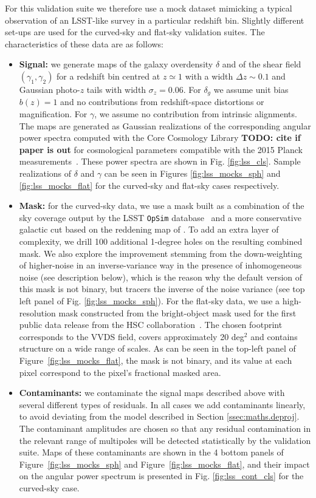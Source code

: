 \documentclass[usenatbib]{mnrasb}
\newcommand{\todo}[1]{{\bf TODO: #1}}
\newcommand{\todo}[1]{}
\begin{document}
        For this validation suite we therefore use a mock dataset mimicking a typical observation of an LSST-like survey in a particular redshift bin. Slightly different set-ups are used for the curved-sky and flat-sky validation suites. The characteristics of these data are as follows:
        \begin{itemize}
          \item {\bf Signal:} we generate maps of the galaxy overdensity $\delta$ and of the shear field $(\gamma_1,\gamma_2)$ for a redshift bin centred at $z\simeq1$ with a width $\Delta z\sim0.1$ and Gaussian photo-$z$ tails with width $\sigma_z=0.06$. For $\delta_g$ we assume unit bias $b(z)=1$ and no contributions from redshift-space distortions or magnification. For $\gamma$, we assume no contribution from intrinsic alignments. The maps are generated as Gaussian realizations of the corresponding angular power spectra computed with the Core Cosmology Library \todo{cite if paper is out} for cosmological parameters compatible with the 2015 Planck measurements~\citet{2016A&A...594A..13P}. These power spectra are shown in Fig. \ref{fig:lss_cls}. Sample realizations of $\delta$ and $\gamma$ can be seen in Figures \ref{fig:lss_mocks_sph} and \ref{fig:lss_mocks_flat} for the curved-sky and flat-sky cases respectively.
          \item {\bf Mask:} for the curved-sky data, we use a mask built as a combination of the sky coverage output by the LSST {\tt OpSim} database~\citet{2014SPIE.9150E..15D} and a more conservative galactic cut based on the reddening map of \citet{1998wfsc.conf..297S}. To add an extra layer of complexity, we drill 100 additional 1-degree holes on the resulting combined mask. We also explore the improvement stemming from the down-weighting of higher-noise in an inverse-variance way in the presence of inhomogeneous noise (see description below), which is the reason why the default version of this mask is not binary, but tracers the inverse of the noise variance (see top left panel of Fig. \ref{fig:lss_mocks_sph}). For the flat-sky data, we use a high-resolution mask constructed from the bright-object mask used for the first public data release from the HSC collaboration~\citep{2018PASJ...70S...4A}. The chosen footprint corresponds to the VVDS field, covers approximately 20 deg$^2$ and contains structure on a wide range of scales. As can be seen in the top-left panel of Figure~\ref{fig:lss_mocks_flat}, the mask is not binary, and its value at each pixel correspond to the pixel's fractional masked area.
          \item {\bf Contaminants:} we contaminate the signal maps described above with several different types of residuals. In all cases we add contaminants linearly, to avoid deviating from the model described in Section \ref{ssec:maths.deproj}. The contaminant amplitudes are chosen so that any residual contamination in the relevant range of multipoles will be detected statistically by the validation suite. Maps of these contaminants are shown in the 4 bottom panels of Figure~\ref{fig:lss_mocks_sph} and Figure~\ref{fig:lss_mocks_flat}, and their impact on the angular power spectrum is presented in Fig. \ref{fig:lss_cont_cls} for the curved-sky case.

\end{itemize}
\end{document}
